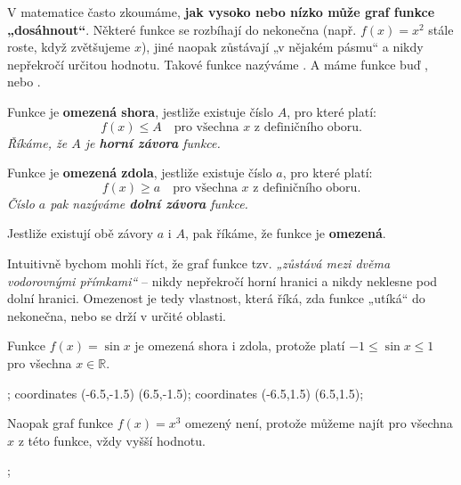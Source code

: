 \documentclass[12pt,a4paper]{article}
\begin{document}
V matematice často zkoumáme, \textbf{jak vysoko nebo nízko může graf funkce „dosáhnout“}.  
Některé funkce se rozbíhají do nekonečna (např. \(f(x) = x^2\) stále roste, když zvětšujeme \(x\)),  
jiné naopak zůstávají „v nějakém pásmu“ a nikdy nepřekročí určitou hodnotu.  
Takové funkce nazýváme . A máme funkce buď , nebo .

\begin{definitionbox}

Funkce je \textbf{omezená shora}, jestliže existuje číslo \(A\), pro které platí:
    \[
    f(x) \leq A \quad \text{pro všechna } x \text{ z definičního oboru.}
    \]
\emph{Říkáme, že \(A\) je \textbf{horní závora} funkce.}

\smallskip
Funkce je \textbf{omezená zdola}, jestliže existuje číslo \(a\), pro které platí:
    \[
    f(x) \geq a \quad \text{pro všechna } x \text{ z definičního oboru.}
    \]
\emph{Číslo \(a\) pak nazýváme \textbf{dolní závora} funkce.}
    
Jestliže existují obě závory \(a\) i \(A\), pak říkáme, že funkce je \textbf{omezená}.

\end{definitionbox}

Intuitivně bychom mohli říct, že graf funkce tzv. \emph{„zůstává mezi dvěma vodorovnými přímkami“} –  
nikdy nepřekročí horní hranici a nikdy neklesne pod dolní hranici.  
Omezenost je tedy vlastnost, která říká, zda funkce „utíká“ do nekonečna, nebo se drží v určité oblasti.


\begin{examplebox}
Funkce \(f(x) = \sin x\) je omezená shora i zdola, protože platí \(-1 \leq \sin x \leq 1\) pro všechna \(x \in \mathbb{R}\).
\begin{center}
    \begin{axisgraph}[grid=minor, xmin=-6.5, xmax=6.5, ymin=-2, ymax=2, title={Graf funkce: \(f(x)=\sin x\)}]
        ;
             coordinates {(-6.5,-1.5) (6.5,-1.5)};
             coordinates {(-6.5,1.5) (6.5,1.5)};
    \end{axisgraph}
\end{center}
Naopak graf funkce $f(x) = x^3$ omezený není, protože můžeme najít pro všechna $x$ z této funkce, vždy vyšší hodnotu.
\begin{center}
    \begin{axisgraph}[grid=minor, xmin=-3, xmax=3, ymin=-4, ymax=4, title={Graf funkce: \(f(x)=x^3\)}]
        ;
    \end{axisgraph}
\end{center}
\end{examplebox}
\end{document}
